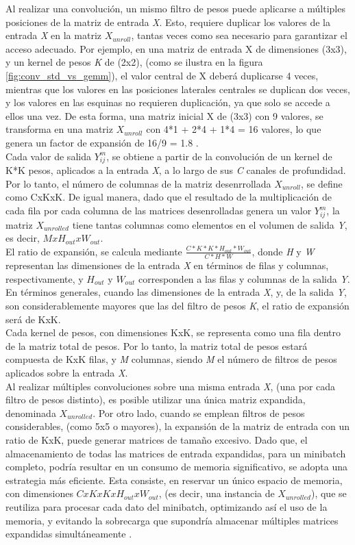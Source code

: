 Al realizar una convolución, un mismo filtro de pesos puede aplicarse a múltiples posiciones de la matriz de entrada \textit{X}. Esto, requiere duplicar los valores de la entrada \textit{X} en la matriz $X_{unroll}$, tantas veces como sea necesario para garantizar el acceso adecuado. Por ejemplo, en una matriz de entrada X de dimensiones (3x3), y un kernel de pesos \textit{K} de (2x2), (como se ilustra en la figura \ref{fig:conv_std_vs_gemm}), el valor central de X deberá duplicarse 4 veces, mientras que los valores en las posiciones laterales centrales se duplican dos veces, y los valores en las esquinas no requieren duplicación, ya que solo se accede a ellos una vez. De esta forma, una matriz inicial X de (3x3) con 9 valores, se transforma en una matriz $X_{unroll}$ con 4*1 + 2*4 + 1*4 = 16 valores, lo que genera un factor de expansión de 16/9 = 1.8 . \\
Cada valor de salida $Y^m_{ij}$, se obtiene a partir de la convolución de un kernel de K*K pesos, aplicados a la entrada \textit{X}, a lo largo de sus \textit{C} canales de profundidad. Por lo tanto, el número de columnas de la matriz desenrrollada $X_{unroll}$, se define como CxKxK. De igual manera, dado que el resultado de la multiplicación de cada fila por cada columna de las matrices desenrolladas genera un valor $Y^m_{ij}$, la matriz $X_{unrolled}$ tiene tantas columnas como elementos en el volumen de salida \textit{Y}, es decir, $MxH_{out}xW_{out}$. \\
El ratio de expansión, se calcula mediante $\frac{C*K*K*H_{out}*W_{out}}{C*H*W}$, donde \textit{H} y \textit{W} representan las dimensiones de la entrada \textit{X} en términos de filas y columnas, respectivamente, y $H_{out}$ y $W_{out}$ corresponden a las filas y columnas de la salida \textit{Y}. En términos generales, cuando las dimensiones de la entrada \textit{X}, y, de la salida \textit{Y}, son considerablemente mayores que las del filtro de pesos \textit{K}, el ratio de expansión será de KxK. \\
Cada kernel de pesos, con dimensiones KxK, se representa como una fila dentro de la matriz total de pesos. Por lo tanto, la matriz total de pesos estará compuesta de KxK filas, y \textit{M} columnas, siendo \textit{M} el número de filtros de pesos aplicados sobre la entrada \textit{X}. \\
Al realizar múltiples convoluciones sobre una misma entrada \textit{X}, (una por cada filtro de pesos distinto), es posible utilizar una única matriz expandida, denominada $X_{unrolled}$. Por otro lado, cuando se emplean filtros de pesos considerables, (como 5x5 o mayores), la expansión de la matriz de entrada con un ratio de KxK, puede generar matrices de tamaño excesivo. Dado que, el almacenamiento de todas las matrices de entrada expandidas, para un minibatch completo, podría resultar en un consumo de memoria significativo, se adopta una estrategia más eficiente. Esta consiste, en reservar un único espacio de memoria, con dimensiones $CxKxKxH_{out}xW_{out}$, (es decir, una instancia de $X_{unrolled}$), que se reutiliza para procesar cada dato del minibatch, optimizando así el uso de la memoria, y evitando la sobrecarga que supondría almacenar múltiples matrices expandidas simultáneamente \cite{Programming_Massively}.

